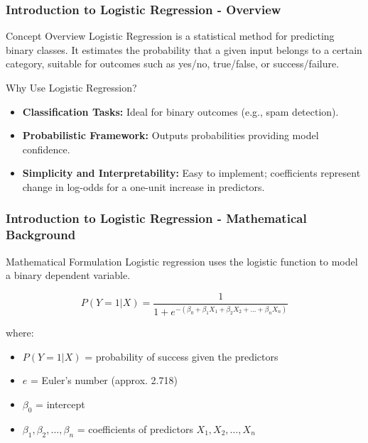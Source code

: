 \documentclass[aspectratio=169]{beamer}
\begin{document}
\begin{frame}
    \frametitle{Introduction to Logistic Regression - Overview}
    \begin{block}{Concept Overview}
        Logistic Regression is a statistical method for predicting binary classes. It estimates the probability that a given input belongs to a certain category, suitable for outcomes such as yes/no, true/false, or success/failure.
    \end{block}
    
    \begin{block}{Why Use Logistic Regression?}
        \begin{itemize}
            \item \textbf{Classification Tasks:} Ideal for binary outcomes (e.g., spam detection).
            \item \textbf{Probabilistic Framework:} Outputs probabilities providing model confidence.
            \item \textbf{Simplicity and Interpretability:} Easy to implement; coefficients represent change in log-odds for a one-unit increase in predictors.
        \end{itemize}
    \end{block}
\end{frame}

\begin{frame}
    \frametitle{Introduction to Logistic Regression - Mathematical Background}
    \begin{block}{Mathematical Formulation}
        Logistic regression uses the logistic function to model a binary dependent variable.
    \end{block}
    
    \begin{equation}
        P(Y=1 | X) = \frac{1}{1 + e^{-(\beta_0 + \beta_1X_1 + \beta_2X_2 + ... + \beta_nX_n)}}
    \end{equation}
    
    where:
    \begin{itemize}
        \item $P(Y=1 | X)$ = probability of success given the predictors
        \item $e$ = Euler's number (approx. 2.718)
        \item $\beta_0$ = intercept
        \item $\beta_1, \beta_2, \ldots, \beta_n$ = coefficients of predictors $X_1, X_2, \ldots, X_n$
    \end{itemize}
\end{frame}
\end{document}
